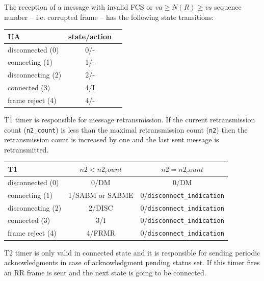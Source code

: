 \documentclass[a4paper]{article}
\begin{document}
The reception of a message with invalid FCS or	$va \geq N(R) \geq vs$ sequence number -- i.e. corrupted frame -- has
the following state transitions:

{\footnotesize
\begin{center}
    \begin{tabular}{|l|c|c|}
        \hline
        UA                & state/action  \\
        \hline
        disconnected (0)  & 0/-           \\
        \hline
        connecting (1)    & 1/-           \\
        \hline
        disconnecting (2) & 2/-           \\
        \hline
        connected (3)     & 4/I           \\
        \hline
        frame reject (4)  & 4/-           \\
        \hline
    \end{tabular}
\end{center}
}

T1 timer is responsible for message retransmission. If the current retransmission count (\verb!n2_count!)
is less than the maximal retransmission count (\verb!n2!) then the retransmission count is increased
by one and the last sent message is retransmitted.

{\footnotesize
\begin{center}
    \begin{tabular}{|l|c|c|}
        \hline
        T1                & $n2 < n2_count$ & $n2 = n2_count$                \\
        \hline
        disconnected (0)  & 0/DM            & 0/DM                           \\
        \hline
        connecting (1)    & 1/SABM or SABME & 0/\verb!disconnect_indication!  \\
        \hline
        disconnecting (2) & 2/DISC          & 0/\verb!disconnect_indication!  \\
        \hline
        connected (3)     & 3/I             & 0/\verb!disconnect_indication!  \\
        \hline
        frame reject (4)  & 4/FRMR          & 0/\verb!disconnect_indication!  \\
        \hline
    \end{tabular}
\end{center}
}

T2 timer is only valid in connected state and it is responsible for sending periodic acknowledgments in case of
acknowledgment pending status set. If this timer fires an RR frame is sent and the next state is going to be connected.
\end{document}
